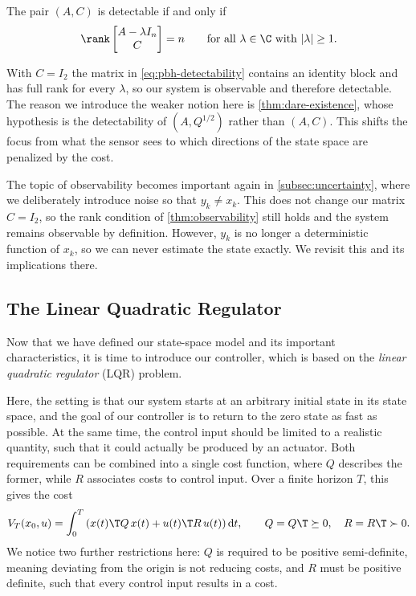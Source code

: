 \begin{theorem}
\label{thm:pbh-detectability}
The pair $(A, C)$ is detectable if and only if
\begin{equation}
    \label{eq:pbh-detectability}
    \rank \begin{bmatrix} A - \lambda I_n \\ C \end{bmatrix} = n
    \qquad \text{for all } \lambda \in \C \text{ with } \lvert \lambda \rvert \ge 1 .
\end{equation}
\end{theorem}

With $C = I_2$ the matrix in \eqref{eq:pbh-detectability} contains an identity
block and has full rank for every $\lambda$, so our system is observable and
therefore detectable. The reason we introduce the weaker notion here is
\cref{thm:dare-existence}, whose hypothesis is the detectability of
$(A, Q^{1/2})$ rather than $(A, C)$. This shifts the focus from what
the sensor sees to which directions of the state space are penalized by the
cost.

The topic of observability becomes important again in
\cref{subsec:uncertainty}, where we deliberately introduce noise so that
$y_k \neq x_k$. This does not change our matrix $C = I_2$, 
so the rank condition of \cref{thm:observability} still
holds and the system remains observable by definition. However,
$y_k$ is no longer a deterministic function of $x_k$, so we can
never estimate the state exactly. We revisit this and its
implications there.
 
\subsection{The Linear Quadratic Regulator}
\label{subsec:lqr}

Now that we have defined our state-space model and its important
characteristics, it is time to introduce our controller, which is based on the
\emph{linear quadratic regulator} (LQR) problem.

Here, the setting is that our system starts at an arbitrary initial state in its
state space, and the goal of our controller is to return to the zero state as
fast as possible. At the same time, the control input should be limited to a realistic
quantity, such that it could actually be produced by an actuator.
Both requirements can be combined into a single cost function, where $Q$
describes the former, while $R$
associates costs to control input. Over a finite horizon $T$, this gives the
cost~
\begin{equation}
    \label{eq:lqr-cost-finite}
    V_T(x_0, u) = \int_{0}^{T} \left( x(t)\T Q\, x(t) + u(t)\T R\, u(t) \right) \mathrm{d}t ,
    \qquad Q = Q\T \succeq 0, \quad R = R\T \succ 0 .
\end{equation}
We notice two further restrictions here: $Q$ is required to be positive
semi-definite, meaning deviating from the origin is not reducing costs,
and $R$ must be positive definite, such that every control input results in a cost.

